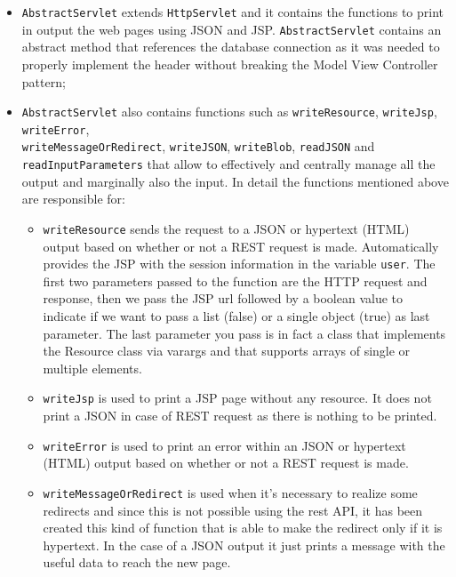 \begin{itemize}
    \item \texttt{AbstractServlet} extends \texttt{HttpServlet} and
    it contains the functions to print in output the web pages using JSON and JSP.
    \texttt{AbstractServlet} contains an abstract method that references the 
    database connection as it was needed to properly implement the header
    without breaking the Model View Controller pattern;

    \item \texttt{AbstractServlet} also contains functions such as
    \texttt{writeResource}, \texttt{writeJsp}, \texttt{writeError}, \\
    \texttt{writeMessageOrRedirect}, \texttt{writeJSON}, \texttt{writeBlob},
    \texttt{readJSON}  and \texttt{readInputParameters}
    that allow to effectively and centrally manage all the output
    and marginally also the input.
    In detail the functions mentioned above are responsible for: 
    \begin{itemize}
        \item \texttt{writeResource} sends the request to a JSON
        or hypertext (HTML) output based on whether or not a REST request is made.
        Automatically provides the JSP with the session information in
        the variable \texttt{user}.
        The first two parameters passed to the function are the HTTP request and 
        response, then we pass the JSP url followed by a boolean
        value to indicate if we want to pass a list (false) or a single object (true) as last parameter.
        The last parameter you pass is in fact a class that implements the
        Resource class via varargs and that supports arrays of single or multiple elements.
        \item \texttt{writeJsp} is used to print a JSP page without any resource.
        It does not print a JSON in case of REST request as there is nothing to be printed.
        \item \texttt{writeError}  is used to print an error within an
        JSON or hypertext (HTML) output based on whether or not a REST request is made.
        \item \texttt{writeMessageOrRedirect} is used when it's necessary to realize some redirects and since this is not possible
        using the rest API, it has been created this kind of function that is able to make
        the redirect only if it is hypertext. In the case of a JSON output it just
        prints a message with the useful data to reach the new page.

\end{itemize}
\end{itemize}
